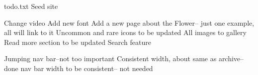 todo.txt Seed site

Change video
Add new font
Add a new page about the Flower-- just one example, all will link to it
Uncommon and rare icons to be updated
All images to gallery
Read more section to be updated
Search feature


Jumping nav bar--not too important
Consistent width, about same as archive--done
nav bar width to be consistent-- not needed
